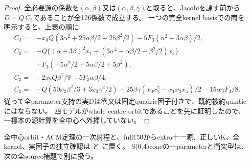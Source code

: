 \documentclass[a4paper,11pt]{ltjsarticle}
\theoremstyle{definition}
\begin{document}
\begin{proof}
全必要源の係数を$(\alpha,\beta)$又は$(\alpha,\beta,\gamma)$と取ると、Jacobiを課す前から
$D=Q\,C_3$であることが全126係数で成立する。
一つの完全kernel basisでの商を明示すると、上表の順に
\[
\begin{aligned}
 C_3={}&-x_0Q(3\alpha^2+25\alpha\beta/2+25\beta^2/2)-5F_3(\alpha^2+3\alpha\beta)/2,\\
 C_3={}&-Q\{(\alpha+3\beta)^2x_1+(3\alpha^2+\alpha\beta/2-\beta^2/2)x_4\}\\
 &+F_3(-5\alpha^2/2+5\alpha\beta/2+5\beta^2),\\
 C_3={}&-2x_2Q\beta^2/9-5F_3\alpha\beta/4,\\
 C_3={}&-Q(50x_2\beta^2/3+3x_3\gamma^2/2)
       +25\beta\gamma(x_0x_3^2-x_1x_2x_4)/2-15\alpha\gamma F_3/8.
\end{aligned}
\]
従って全parameter支持の実Dは零又は固定quadric因子付きで、既約被約quinticにはならない。
四モデルがwhole centre orbitであることを先に証明したので、一標本の源計算を全中心へ外挿していない。
\end{proof}
全中心orbit・ACM定理の一次射程と、full150からextra十一源、正しいK、全kernel、実因子の独立確認は
と
に置く。
S(0,4)coneの一parameterと衝突型は、次の全source補題で別に扱う。
\end{document}
